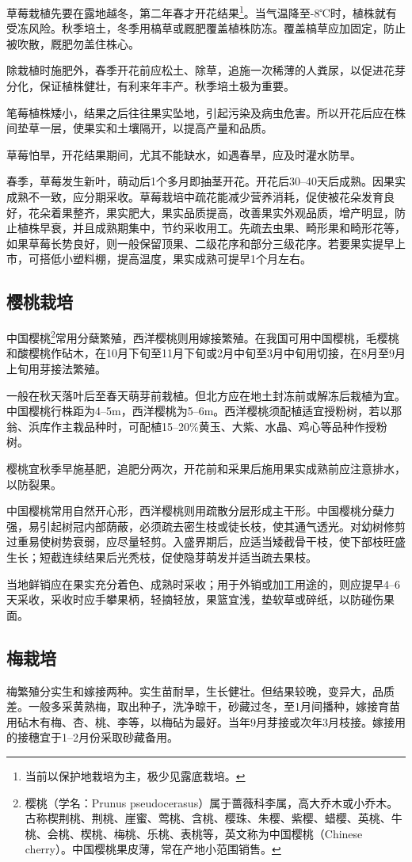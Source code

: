 \documentclass{ctexbook}
\begin{document}
草莓栽植先要在露地越冬，第二年春才开花结果\footnote{当前以保护地栽培为主，极少见露底栽培。}。当气温降至-8℃时，植株就有受冻风险。秋季培土，冬季用槁草或厩肥覆盖植株防冻。覆盖槁草应加固定，防止被吹散，厩肥勿盖住株心。

除栽植时施肥外，春季开花前应松土、除草，追施一次稀薄的人粪尿，以促进花芽分化，保证植株健壮，有利来年丰产。秋季培土极为重要。

笔莓植株矮小，结果之后往往果实坠地，引起污染及病虫危害。所以开花后应在株间垫草一层，使果实和土壤隔开，以提高产量和品质。

草莓怕旱，开花结果期间，尤其不能缺水，如遇春旱，应及时灌水防旱。

春季，草莓发生新叶，萌动后1个多月即抽茎开花。开花后30--40天后成熟。因果实成熟不一致，应分期采收。草莓栽培中疏花能减少营养消耗，促使被花朵发育良好，花朵着果整齐，果实肥大，果实品质提高，改善果实外观品质，增产明显，防止植株早衰，并且成熟期集中，节约采收用工。先疏去虫果、畸形果和畸形花等，如果草莓长势良好，则一般保留顶果、二级花序和部分三级花序。若要果实提早上市，可搭低小塑料棚，提高温度，果实成熟可提早1个月左右。
\subsection{樱桃栽培}
中国樱桃\footnote{樱桃（学名：Prunus pseudocerasus）属于蔷薇科李属，高大乔木或小乔木。古称楔荆桃、荆桃、崖蜜、莺桃、含桃、樱珠、朱樱、紫樱、蜡樱、英桃、牛桃、会桃、楔桃、梅桃、乐桃、表桃等，英文称为中国樱桃（Chinese cherry）。中国樱桃果皮薄，常在产地小范围销售。}常用分蘖繁殖，西洋樱桃则用嫁接繁殖。在我国可用中国樱桃，毛樱桃和酸樱桃作砧木，在10月下旬至11月下旬或2月中旬至3月中旬用切接，在8月至9月上旬用芽接法繁殖。

一般在秋天落叶后至春天萌芽前栽植。但北方应在地土封冻前或解冻后栽植为宜。中国樱桃行株距为4--5m，西洋樱桃为5--6m。西洋樱桃须配植适宜授粉树，若以那翁、浜库作主栽品种时，可配植15--20\%黄玉、大紫、水晶、鸡心等品种作授粉树。

樱桃宜秋季早施基肥，追肥分两次，开花前和采果后施用果实成熟前应注意排水，以防裂果。

中国樱桃常用自然开心形，西洋樱桃则用疏散分层形成主干形。中国樱桃分蘖力强，易引起树冠内部荫蔽，必须疏去密生枝或徒长枝，使其通气透光。对幼树修剪过重易使树势衰弱，应尽量轻剪。入盛界期后，应适当矮截骨干枝，使下部枝旺盛生长；短截连续结果后光秃枝，促使隐芽萌发并适当疏去果枝。

当地鲜销应在果实充分着色、成熟时采收；用于外销或加工用途的，则应提早4--6天采收，采收时应手攀果柄，轻摘轻放，果篮宜浅，垫软草或碎纸，以防碰伤果面。
\subsection{梅栽培}
梅繁殖分实生和嫁接两种。实生苗耐旱，生长健壮。但结果较晚，变异大，品质差。一般多采黄熟梅，取出种子，洗净晾干，砂藏过冬，至1月间播种，嫁接育苗用砧木有梅、杏、桃、李等，以梅砧为最好。当年9月芽接或次年3月枝接。嫁接用的接穗宜于1--2月份采取砂藏备用。
\end{document}
